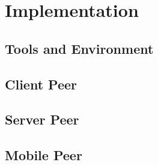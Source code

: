 \chapter{Implementation}
\label{chap:implementation}


\section{Tools and Environment}

\section{Client Peer}

\section{Server Peer}

\section{Mobile Peer}
